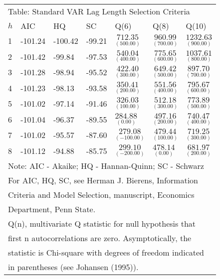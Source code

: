 \documentclass{article}
\begin{document}
 \begin{tabular}{lllllll} 
 \multicolumn{7}{l}{Table: Standard VAR Lag Length Selection Criteria } \\ 
 $h$ & AIC & HQ & SC & Q(6) & Q(8) & Q(10) \\ 
 1 & -101.24 & -100.42 &  -99.21 & $\underset{( 500.00)}{ 712.35}$ & $\underset{( 700.00)}{ 960.99}$ & $\underset{( 900.00)}{1232.63}$ \\  
 2 & -101.42 &  -99.84 &  -97.53 & $\underset{( 400.00)}{ 540.04}$ & $\underset{( 600.00)}{ 775.65}$ & $\underset{( 800.00)}{1037.61}$ \\  
 3 & -101.28 &  -98.94 &  -95.52 & $\underset{( 300.00)}{ 422.40}$ & $\underset{( 500.00)}{ 649.42}$ & $\underset{( 700.00)}{ 897.70}$ \\  
 4 & -101.23 &  -98.13 &  -93.58 & $\underset{( 200.00)}{ 350.41}$ & $\underset{( 400.00)}{ 551.56}$ & $\underset{( 600.00)}{ 795.67}$ \\  
 5 & -101.02 &  -97.14 &  -91.46 & $\underset{( 100.00)}{ 326.03}$ & $\underset{( 300.00)}{ 512.18}$ & $\underset{( 500.00)}{ 773.89}$ \\  
 6 & -101.04 &  -96.37 &  -89.55 & $\underset{(   0.00)}{ 284.88}$ & $\underset{( 200.00)}{ 497.16}$ & $\underset{( 400.00)}{ 740.47}$ \\  
 7 & -101.02 &  -95.57 &  -87.60 & $\underset{(-100.00)}{ 279.08}$ & $\underset{( 100.00)}{ 479.44}$ & $\underset{( 300.00)}{ 719.25}$ \\  
 8 & -101.12 &  -94.88 &  -85.75 & $\underset{(-200.00)}{ 299.10}$ & $\underset{(   0.00)}{ 478.14}$ & $\underset{( 200.00)}{ 681.97}$ \\  
 \multicolumn{7}{l}{Note: AIC - Akaike; HQ - Hannan-Quinn; SC - Schwarz} \\ 
 \multicolumn{7}{l}{For AIC, HQ, SC, see Herman J. Bierens, Information} \\ 
 \multicolumn{7}{l}{Criteria and Model Selection, manuscript, Economics } \\ 
 \multicolumn{7}{l}{Department, Penn State.} \\ 
 \multicolumn{7}{l}{Q(n), multivariate Q statistic for null hypothesis that} \\  
 \multicolumn{7}{l}{first n autocorrelations are zero. Asymptotically, the} \\  
 \multicolumn{7}{l}{statistic is Chi-square with degrees of freedom indicated} \\  
 \multicolumn{7}{l}{in parentheses (see Johansen (1995)).}%
 \end{tabular} 
 
\end{document}
